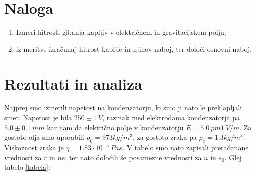 \documentclass[12pt]{article}
\begin{document}
\section{Naloga}

\begin{enumerate}
    \item Izmeri hitrosti gibanja kapljiv v električnem in gravitacijskem polju,
    \item iz meritve izračunaj hitrost kapljic in njihov naboj, ter določi osnovni naboj.
\end{enumerate}


\section{Rezultati in analiza}

Najprej smo izmerili napetost na kondenzatorju, ki smo ji nato le preklapljali smer. Napetost je bila $250\pm 1\ V$, razmak med elektrodama kondenzatorja pa $5.0\pm 0.1\ mm$ kar nam da električno polje v kondenzatorju $E = 5.0\ pm 1\ V/m$. Za gostoto olja smo uporabili $\rho_0 = 973 kg/m^3$, za gostoto zraka pa $\rho_z = 1.3 kg/m^3$. Viskoznost zraka je $\eta = 1.83 \cdot 10^{-5}\ Pas$. V tabelo smo nato zapisali preračunane vrednosti za $r$ in $ne$, ter nato določili še posamezne vrednosti za $n$ in $e_0$. Glej tabelo \ref{tabela}:
\end{document}
